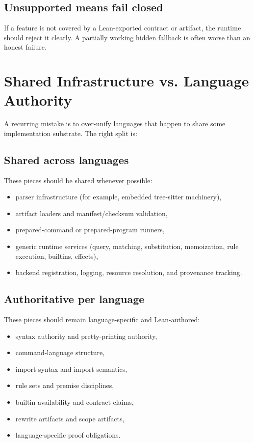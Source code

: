 \documentclass[11pt]{article}
\begin{document}
\subsection{Unsupported means fail closed}
If a feature is not covered by a Lean-exported contract or artifact, the runtime should reject it clearly. A partially working hidden fallback is often worse than an honest failure.

\section{Shared Infrastructure vs. Language Authority}

A recurring mistake is to over-unify languages that happen to share some implementation substrate. The right split is:

\subsection{Shared across languages}
These pieces should be shared whenever possible:
\begin{itemize}
  \item parser infrastructure (for example, embedded tree-sitter machinery),
  \item artifact loaders and manifest/checksum validation,
  \item prepared-command or prepared-program runners,
  \item generic runtime services (query, matching, substitution, memoization, rule execution, builtins, effects),
  \item backend registration, logging, resource resolution, and provenance tracking.
\end{itemize}

\subsection{Authoritative per language}
These pieces should remain language-specific and Lean-authored:
\begin{itemize}
  \item syntax authority and pretty-printing authority,
  \item command-language structure,
  \item import syntax and import semantics,
  \item rule sets and premise disciplines,
  \item builtin availability and contract claims,
  \item rewrite artifacts and scope artifacts,
  \item language-specific proof obligations.
\end{itemize}
\end{document}
